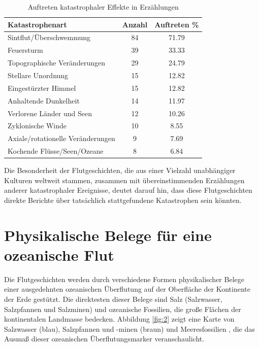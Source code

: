 \documentclass[10pt,twocolumn,letterpaper]{article}
\begin{document}
\begin{table}[ht]
\begin{center}
\renewcommand{\arraystretch}{1.2}  %
\begin{tabular}{|l|c|c|}
\hline
\textbf{Katastrophenart} & \textbf{Anzahl} & \textbf{Auftreten \%} \\
\hline\hline
Sintflut/Überschwemmung  & 84 & 71.79 \\
Feuersturm               & 39 & 33.33 \\
Topographische Veränderungen & 29 & 24.79 \\
Stellare Unordnung         & 15 & 12.82 \\
Eingestürzter Himmel       & 15 & 12.82 \\
Anhaltende Dunkelheit      & 14 & 11.97 \\

Verlorene Länder und Seen   & 12 & 10.26 \\
Zyklonische Winde          & 10 & 8.55  \\
Axiale/rotationelle Veränderungen & 9 & 7.69  \\
Kochende Flüsse/Seen/Ozeane & 8 & 6.84 \\
\hline
\end{tabular}
\end{center}
\caption{Auftreten katastrophaler Effekte in Erzählungen}
\label{tab: 1}
\end{table}

Die Besonderheit der Flutgeschichten, die aus einer Vielzahl unabhängiger Kulturen weltweit stammen, zusammen mit übereinstimmenden Erzählungen anderer katastrophaler Ereignisse, deutet darauf hin, dass diese Flutgeschichten direkte Berichte über tatsächlich stattgefundene Katastrophen sein könnten.

\section{Physikalische Belege für eine ozeanische Flut}

Die Flutgeschichten werden durch verschiedene Formen physikalischer Belege einer ausgedehnten ozeanischen Überflutung auf der Oberfläche der Kontinente der Erde gestützt. Die direktesten dieser Belege sind Salz (Salzwasser, Salzpfannen und Salzminen) und ozeanische Fossilien, die große Flächen der kontinentalen Landmasse bedecken. Abbildung \ref{fig:2} zeigt eine Karte von Salzwasser (blau), Salzpfannen und -minen (braun) und Meeresfossilien \cite{15,16,86,87}, die das Ausmaß dieser ozeanischen Überflutungsmarker veranschaulicht.
\end{document}
